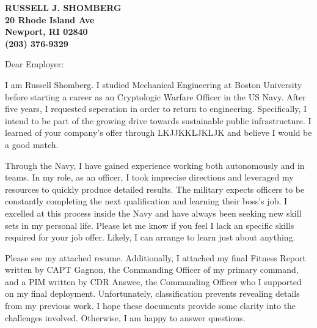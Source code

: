 \documentclass[11pt]{letter} %
\begin{document}
\signature{Russell Shomberg}                  %
\longindentation=0pt                       %
\let\raggedleft\raggedright                %
 
\begin{letter}

\begin{center}
\large\bf RUSSELL J. SHOMBERG \\
20 Rhode Island Ave \\ Newport, RI 02840 \\ (203) 376-9329
\end{center} 
\vfill %


 
\opening{Dear Employer:} 
 
\noindent I am Russell Shomberg. I studied Mechanical Engineering at Boston University before starting a career as an Cryptologic Warfare Officer in the US Navy. After five years, I requested seperation in order to return to engineering. Specifically, I intend to be part of the growing drive towards sustainable public infrastructure. I learned of your company's offer through LKJJKKLJKLJK and believe I would be a good match.

\noindent Through the Navy, I have gained experience working both autonomously and in teams. In my role, as an officer, I took imprecise directions and leveraged my resources to quickly produce detailed results. The military expects officers to be constantly completing the next qualification and learning their boss's job. I excelled at this process inside the Navy and have always been seeking new skill sets in my personal life. Please let me know if you feel I lack an specific skills required for your job offer. Likely, I can arrange to learn just about anything.

\noindent Please see my attached resume. Additionally, I attached my final Fitness Report written by CAPT Gagnon, the Commanding Officer of my primary command, and a PIM written by CDR Answee, the Commanding Officer who I supported on my final deployment. Unfortunately, classification prevents revealing details from my previous work. I hope these documents provide some clarity into the challenges involved. Otherwise, I am happy to answer questions.


\end{letter}
\end{document}
